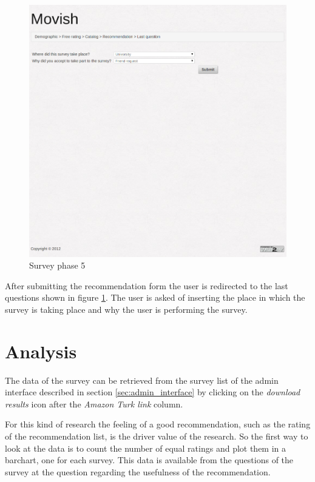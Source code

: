 \begin{figure}
  \centering
  \includegraphics[width=\textwidth]{figures/survey_localinfo.png}
  \caption{Survey phase 5}
  \label{fig:survey_phase_5}
\end{figure}

After submitting the recommendation form the user is redirected to the last questions shown in figure \ref{fig:survey_phase_5}. The user is asked of inserting the place in which the survey is taking place and why the user is performing the survey.

\section{Analysis}
\label{sec:research_analysis}

The data of the survey can be retrieved from the survey list of the admin interface described in section \ref{sec:admin_interface} by clicking on the \textit{download results} icon after the \textit{Amazon Turk link} column.

For this kind of research the feeling of a good recommendation, such as the rating of the recommendation list, is the driver value of the research. So the first way to look at the data is to count the number of equal ratings and plot them in a barchart, one for each survey. This data is available from the questions of the survey at the question regarding the usefulness of the recommendation.

